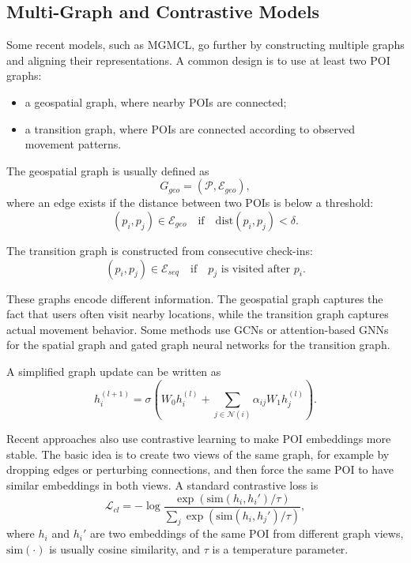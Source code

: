 \documentclass[12pt, journal]{IEEEtran}
\begin{document}
\subsection{Multi-Graph and Contrastive Models}

Some recent models, such as MGMCL, go further by constructing multiple graphs and aligning their representations. A common design is to use at least two POI graphs:

\begin{itemize}
    \item a geospatial graph, where nearby POIs are connected;
    \item a transition graph, where POIs are connected according to observed movement patterns.
\end{itemize}

The geospatial graph is usually defined as
\begin{equation}
    G_{geo} = (\mathcal{P}, \mathcal{E}_{geo}),
\end{equation}
where an edge exists if the distance between two POIs is below a threshold:
\begin{equation}
    (p_i,p_j) \in \mathcal{E}_{geo}
    \quad \text{if} \quad
    \mathrm{dist}(p_i,p_j) < \delta.
\end{equation}

The transition graph is constructed from consecutive check-ins:
\begin{equation}
    (p_i,p_j) \in \mathcal{E}_{seq}
    \quad \text{if} \quad
    p_j \text{ is visited after } p_i.
\end{equation}

These graphs encode different information. The geospatial graph captures the fact that users often visit nearby locations, while the transition graph captures actual movement behavior. Some methods use GCNs or attention-based GNNs for the spatial graph and gated graph neural networks for the transition graph.

A simplified graph update can be written as
\begin{equation}
    h_i^{(l+1)} =
    \sigma \left(
    W_0 h_i^{(l)} +
    \sum_{j \in \mathcal{N}(i)}
    \alpha_{ij} W_1 h_j^{(l)}
    \right).
\end{equation}

Recent approaches also use contrastive learning to make POI embeddings more stable. The basic idea is to create two views of the same graph, for example by dropping edges or perturbing connections, and then force the same POI to have similar embeddings in both views. A standard contrastive loss is
\begin{equation}
    \mathcal{L}_{cl}
    =
    -\log
    \frac{
    \exp(\mathrm{sim}(h_i,h_i')/\tau)
    }{
    \sum_{j}
    \exp(\mathrm{sim}(h_i,h_j')/\tau)
    },
\end{equation}
where $h_i$ and $h_i'$ are two embeddings of the same POI from different graph views, $\mathrm{sim}(\cdot)$ is usually cosine similarity, and $\tau$ is a temperature parameter.
\end{document}
